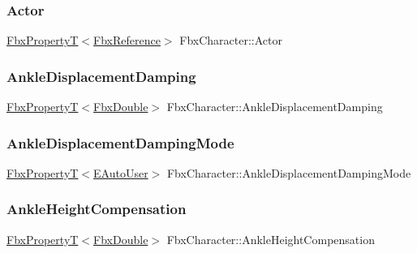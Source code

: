 \subsubsection{\texorpdfstring{Actor}{Actor}}
{\footnotesize\ttfamily \hyperlink{class_fbx_property_t}{Fbx\+PropertyT}$<$\hyperlink{fbxtypes_8h_a44df6a2eec915cf27cd481e5c5e48a24}{Fbx\+Reference}$>$ Fbx\+Character\+::\+Actor}

\mbox{\label{class_fbx_character_ac8b28589ae3323eb9fed84017d421996}} 
\subsubsection{\texorpdfstring{Ankle\+Displacement\+Damping}{AnkleDisplacementDamping}}
{\footnotesize\ttfamily \hyperlink{class_fbx_property_t}{Fbx\+PropertyT}$<$\hyperlink{fbxtypes_8h_a171e72a1c46fc15c1a6c9c31948c1c5b}{Fbx\+Double}$>$ Fbx\+Character\+::\+Ankle\+Displacement\+Damping}

\mbox{\label{class_fbx_character_ac0a3cd5def63f2246ee0b8ad4226c008}} 
\subsubsection{\texorpdfstring{Ankle\+Displacement\+Damping\+Mode}{AnkleDisplacementDampingMode}}
{\footnotesize\ttfamily \hyperlink{class_fbx_property_t}{Fbx\+PropertyT}$<$\hyperlink{class_fbx_character_a5b03462709a82a15d89ee4563a4c49df}{E\+Auto\+User}$>$ Fbx\+Character\+::\+Ankle\+Displacement\+Damping\+Mode}

\mbox{\label{class_fbx_character_a06403d453ebdc44a9ac43d4015984746}} 
\subsubsection{\texorpdfstring{Ankle\+Height\+Compensation}{AnkleHeightCompensation}}
{\footnotesize\ttfamily \hyperlink{class_fbx_property_t}{Fbx\+PropertyT}$<$\hyperlink{fbxtypes_8h_a171e72a1c46fc15c1a6c9c31948c1c5b}{Fbx\+Double}$>$ Fbx\+Character\+::\+Ankle\+Height\+Compensation}

